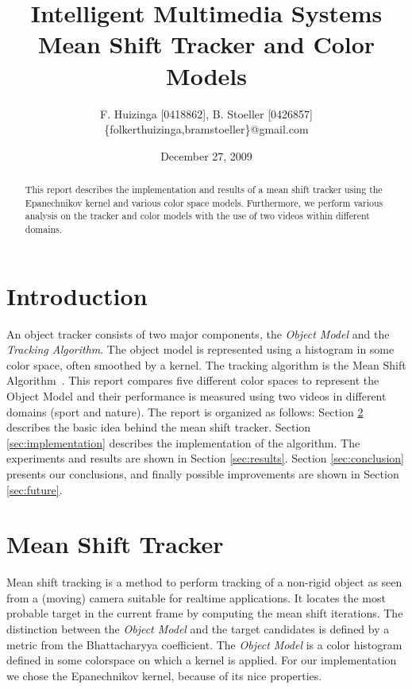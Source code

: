 \documentclass[11pt]{article}
\title{Intelligent Multimedia Systems \\ Mean Shift Tracker and Color Models}
\author{F. Huizinga [0418862], B. Stoeller [0426857] \\
      \{folkerthuizinga,bramstoeller\}@gmail.com}
\date{December 27, 2009}
\begin{document}
\maketitle

\begin{abstract}
This report describes the implementation and results of a mean shift tracker
using the Epanechnikov kernel and various color space models. Furthermore, we
perform various analysis on the tracker and color models with the use of two
videos within different domains.
\end{abstract}


\section{Introduction} \label{sec:intro}
An object tracker consists of two major components, the \emph{Object Model} and
the \emph{Tracking Algorithm}. The object model is represented using a
histogram in some color space, often smoothed by a kernel. The tracking
algorithm is the Mean Shift Algorithm~\cite{kernel-basedobject,
real-timetracking}. This report compares five different color spaces to
represent the Object Model and their performance is measured using two videos
in different domains (sport and nature). The report is organized as follows:
Section \ref{sec:meanshift} describes the basic idea behind the mean shift
tracker. Section \ref{sec:implementation} describes the implementation of the
algorithm. The experiments and results are shown in Section \ref{sec:results}.
Section \ref{sec:conclusion} presents our conclusions, and finally possible
improvements are shown in Section \ref{sec:future}.

\section{Mean Shift Tracker} \label{sec:meanshift}
Mean shift tracking is a method to perform tracking of a non-rigid object as
seen from a (moving) camera suitable for realtime applications. It locates the
most probable target in the current frame by computing the mean shift
iterations. The distinction between the \emph{Object Model} and the target
candidates is defined by a metric from the Bhattacharyya coefficient. The
\emph{Object Model} is a color histogram defined in some colorspace on which a
kernel is applied. For our implementation we chose the Epanechnikov kernel,
because of its nice properties.
\end{document}
